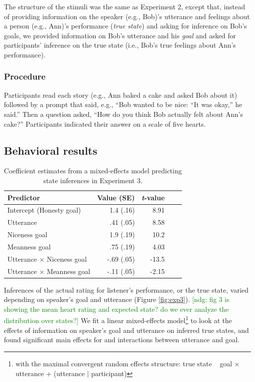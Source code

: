 \documentclass[10pt,letterpaper]{article}
\newcommand{\ndg}[1]{\textcolor{Green}{[ndg: #1]}}
\begin{document}
The structure of the stimuli was the same as Experiment 2, except that, instead of providing information on the speaker (e.g., Bob)'s utterance and feelings about a person (e.g., Ann)'s performance (\emph{true state}) and asking for inference on Bob's goals, we provided information on Bob's utterance and his \emph{goal} and asked for participants' inference on the true state (i.e., Bob's true feelings about Ann's performance).

\subsubsection{Procedure}
Participants read each story (e.g., Ann baked a cake and asked Bob about it) followed by a prompt that said, 
e.g., ``Bob wanted to be nice: ``It was okay,'' he said.''
Then a question asked, ``How do you think Bob actually felt about Ann's cake?''
Participants indicated their answer on a scale of five hearts.

\subsection{Behavioral results}


\begin{table}[t]
\caption{\label{tab:lmer2}  Coefficient estimates from a mixed-effects model predicting state inferences in Experiment 3.} 
\begin{center} 
\begin{tabular}{l r r r l} 
\hline
Predictor  &  Value (SE) & \emph{t}-value\\
\hline
Intercept (Honesty goal)  & 1.4 (.16) & 8.91 \\
Utterance & .41 (.05) &  8.58 \\
Niceness goal  & 1.9 (.19) & 10.2 \\
Meanness goal & .75 (.19) & 4.03 \\
Utterance $\times$ Niceness goal & -.69 (.05) & -13.5 \\
Utterance $\times$ Meanness goal & -.11 (.05) & -2.15 \\
\hline
\end{tabular} 
\end{center} 
\end{table}

Inferences of the actual rating for listener's performance, or the true state, varied depending on speaker's goal and utterance (Figure \ref{fig:exp3}).
\ndg{fig 3 is showing the mean heart rating and expected state? do we ever analyze the distribution over states?}
We fit a linear mixed-effects model\footnote{with the maximal convergent random effects structure: true state ~ goal $\times$ utterance + (utterance $|$ participant)} to look at the effects of information on speaker's goal and utterance on inferred true states, and found significant main effects for and interactions between utterance and goal. 
\end{document}
